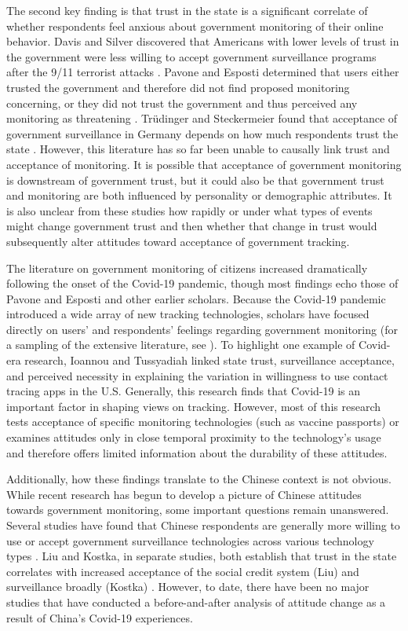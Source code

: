 \documentclass[
  number]{elsarticle}
\begin{document}
The second key finding is that trust in the state is a significant
correlate of whether respondents feel anxious about government
monitoring of their online behavior. Davis and Silver discovered that
Americans with lower levels of trust in the government were less willing
to accept government surveillance programs after the 9/11 terrorist
attacks \citep{davis2004}. Pavone and Esposti determined that users
either trusted the government and therefore did not find proposed
monitoring concerning, or they did not trust the government and thus
perceived any monitoring as threatening \citep{pavone2012}. Trüdinger
and Steckermeier found that acceptance of government surveillance in
Germany depends on how much respondents trust the state
\citep{trüdinger2017}. However, this literature has so far been unable
to causally link trust and acceptance of monitoring. It is possible that
acceptance of government monitoring is downstream of government trust,
but it could also be that government trust and monitoring are both
influenced by personality or demographic attributes. It is also unclear
from these studies how rapidly or under what types of events might
change government trust and then whether that change in trust would
subsequently alter attitudes toward acceptance of government tracking.

The literature on government monitoring of citizens increased
dramatically following the onset of the Covid-19 pandemic, though most
findings echo those of Pavone and Esposti and other earlier scholars.
Because the Covid-19 pandemic introduced a wide array of new tracking
technologies, scholars have focused directly on users' and respondents'
feelings regarding government monitoring (for a sampling of the
extensive literature, see
\citep{abramova2022, garrett2021, ioannou2021, ong, wnuk2020}). To
highlight one example of Covid-era research, Ioannou and Tussyadiah
linked state trust, surveillance acceptance, and perceived necessity in
explaining the variation in willingness to use contact tracing apps in
the U.S. Generally, this research finds that Covid-19 is an important
factor in shaping views on tracking. However, most of this research
tests acceptance of specific monitoring technologies (such as vaccine
passports) or examines attitudes only in close temporal proximity to the
technology's usage and therefore offers limited information about the
durability of these attitudes.

Additionally, how these findings translate to the Chinese context is not
obvious. While recent research has begun to develop a picture of Chinese
attitudes towards government monitoring, some important questions remain
unanswered. Several studies have found that Chinese respondents are
generally more willing to use or accept government surveillance
technologies across various technology types
\citep{habich-sobiegalla2023, kostka2021, kostka2024}. Liu and Kostka,
in separate studies, both establish that trust in the state correlates
with increased acceptance of the social credit system (Liu) and
surveillance broadly (Kostka) \citep{kostka2023, liu2022}. However, to
date, there have been no major studies that have conducted a
before-and-after analysis of attitude change as a result of China's
Covid-19 experiences.
\end{document}
